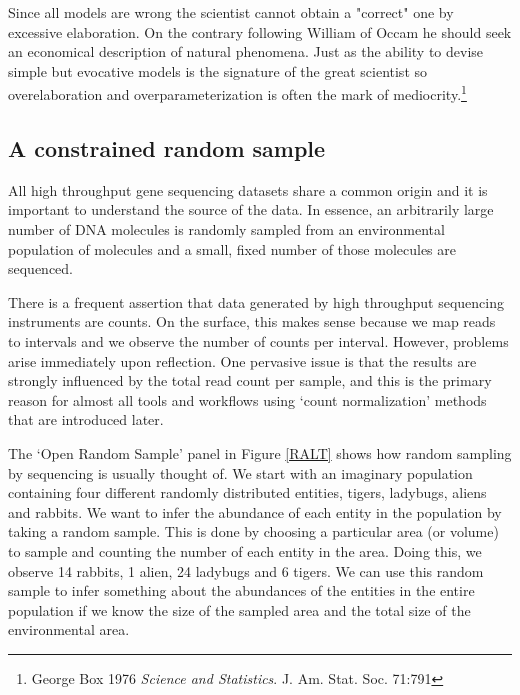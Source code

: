 \documentclass[onecolumn]{article}
\begin{document}
\hspace{2cm}\begin{minipage}[ct]{10cm}
\parskip=5pt
\parindent=5pt

Since all models are wrong the scientist cannot obtain a "correct" one by excessive elaboration. On the contrary following William of Occam he should seek an economical description of natural phenomena. Just as the ability to devise simple but evocative models is the signature of the great scientist so overelaboration and overparameterization is often the mark of mediocrity.\footnote{George Box 1976 \emph{Science and Statistics}. J. Am. Stat. Soc. 71:791}

\end{minipage}

\hypertarget{a-constrained-random-sample}{%
\subsection{A constrained random sample}\label{a-constrained-random-sample}}

All high throughput gene sequencing datasets share a common origin and it is important to understand the source of the data. In essence, an arbitrarily large number of DNA molecules is randomly sampled from an environmental population of molecules and a small, fixed number of those molecules are sequenced.

There is a frequent assertion that data generated by high throughput sequencing instruments are counts. On the surface, this makes sense because we map reads to intervals and we observe the number of counts per interval. However, problems arise immediately upon reflection. One pervasive issue is that the results are strongly influenced by the total read count per sample, and this is the primary reason for almost all tools and workflows using `count normalization' methods that are introduced later.

The `Open Random Sample' panel in Figure \ref{RALT} shows how random sampling by sequencing is usually thought of. We start with an imaginary population containing four different randomly distributed entities, tigers, ladybugs, aliens and rabbits. We want to infer the abundance of each entity in the population by taking a random sample. This is done by choosing a particular area (or volume) to sample and counting the number of each entity in the area. Doing this, we observe 14 rabbits, 1 alien, 24 ladybugs and 6 tigers. We can use this random sample to infer something about the abundances of the entities in the entire population if we know the size of the sampled area and the total size of the environmental area.
\end{document}
